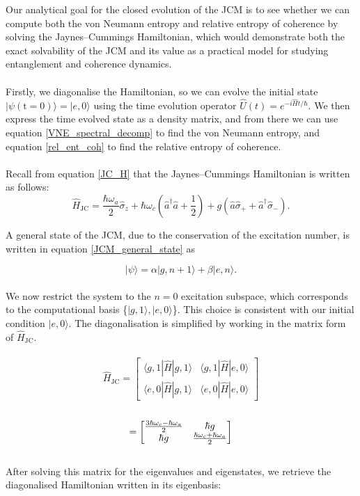 \documentclass[11pt]{article}
\begin{document}
Our analytical goal for the closed evolution of the JCM is to see whether we can compute both the von Neumann entropy and relative entropy of coherence by solving the Jaynes--Cummings Hamiltonian, which would demonstrate both the exact solvability of the JCM and its value as a practical model for studying entanglement and coherence dynamics.\\
\\
Firstly, we diagonalise the Hamiltonian, so we can evolve the initial state $|\psi (\text{t}=0)\rangle = |e, 0\rangle$ using the time evolution operator $\hat{U}(t) = e^{-i\hat{H}t/\hbar}$. We then express the time evolved state as a density matrix, and from there we can use equation \eqref{VNE_spectral_decomp} to find the von Neumann entropy, and equation \eqref{rel_ent_coh} to find the relative entropy of coherence.\\
\\
Recall from equation \eqref{JC_H} that the Jaynes--Cummings Hamiltonian is written as follows:
\begin{equation*}
        \hat{H}_{\scriptscriptstyle \text{JC}} = \frac{\hbar\omega_a}{2}\hat{\sigma}_z + \hbar\omega_c\left(\hat{a}^\dagger \hat{a} + \frac{1}{2} \right) + g(\hat{a}\hat{\sigma}_{+} + \hat{a}^\dagger\hat{\sigma}_{-}).
\end{equation*}

A general state of the JCM, due  to the conservation of the excitation number, is written in equation \eqref{JCM_general_state} as

\begin{equation*}
    |\psi\rangle = \alpha|g,n+1\rangle + \beta|e,n\rangle.
\end{equation*}
\\
We now restrict the system to the $n=0$ excitation subspace, which corresponds to the computational basis \{$|g,1\rangle,|e,0\rangle$\}. This choice is consistent with our initial condition $|e,0\rangle$. The diagonalisation is simplified by working in the matrix form of $\hat{H}_{\scriptscriptstyle \text{JC}}$.\\
\\
\begin{equation*}
    \hat{H}_{\scriptscriptstyle \text{JC}} = 
    \begin{bmatrix}
        \langle g,1|\hat{H}|g,1\rangle & \langle g,1|\hat{H}|e,0\rangle\\
        \langle e,0|\hat{H}|g,1\rangle & \langle e,0|\hat{H}|e,0\rangle
    \end{bmatrix}
\end{equation*}
\\
\begin{equation*}
=
    \begin{bmatrix}
        \large{\frac{3\hbar\omega_c - \hbar\omega_a}{2}} & \small{\hbar g} \\
        \small{\hbar g} & \large{\frac{\hbar\omega_c + \hbar\omega_a}{2}}
    \end{bmatrix}
\end{equation*}
\\
After solving this matrix for the eigenvalues and eigenstates, we retrieve the diagonalised Hamiltonian written in its eigenbasis:
\end{document}
